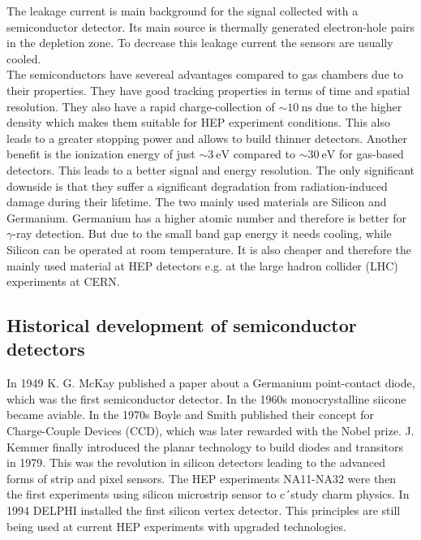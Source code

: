 The leakage current is main background for the signal collected with a semiconductor detector. Its main source is thermally generated electron-hole pairs in the depletion zone. To decrease this leakage current the sensors are usually cooled.\\
The semiconductors have severeal advantages compared to gas chambers due to their properties. They have good tracking properties in terms of time and spatial resolution. They also have a rapid charge-collection of $\sim\SI{10}{\nano\second}$ due to the higher density which makes them suitable for HEP experiment conditions. This also leads to a greater stopping power and allows to build thinner detectors. Another benefit is the ionization energy of just $\sim\SI{3}{\electronvolt}$ compared to $\sim\SI{30}{\electronvolt}$ for gas-based detectors. This leads to a better signal and energy resolution. The only significant downside is that they suffer a significant degradation from radiation-induced damage during their lifetime. The two mainly used materials are Silicon and Germanium. Germanium has a higher atomic number and therefore is better for $\gamma$-ray detection. But due to the small band gap energy it needs cooling, while Silicon can be operated at room temperature. It is also cheaper and therefore the mainly used material at HEP detectors e.g. at the large hadron collider (LHC) experiments at CERN.
\subsection{Historical development of semiconductor detectors}
In 1949 K. G. McKay published a paper about a Germanium point-contact diode, which was the first semiconductor detector. In the 1960s monocrystalline siicone became aviable. In the 1970s Boyle and Smith published their concept for Charge-Couple Devices (CCD), which was later rewarded with the Nobel prize. J. Kemmer finally introduced the planar technology to build diodes and transitors in 1979. This was the revolution in silicon detectors leading to the advanced forms of strip and pixel sensors. The HEP experiments NA11-NA32 were then the first experiments using silicon microstrip sensor to c´study charm physics. In 1994 DELPHI installed the first silicon vertex detector. This principles are still being used at current HEP experiments with upgraded technologies.
